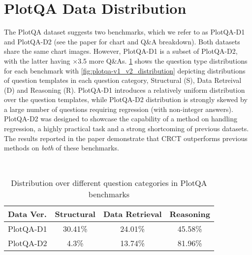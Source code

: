\documentclass[runningheads]{llncs}
\newcommand\our[1][]{CRCT\xspace}
\begin{document}
\section{PlotQA Data Distribution}
The PlotQA dataset suggests two benchmarks, which we refer to as PlotQA-D1 and PlotQA-D2 (see the paper for chart and Q\&A breakdown). Both datasets share the same chart images. However, PlotQA-D1 is a subset of PlotQA-D2, with the latter having $\times$3.5 more Q\&As. \cref{table:plotqa_question_distribution} shows the question type distributions for each benchmark with \cref{fig:plotqa-v1_v2_distribution} depicting distributions of question templates in each question category, Structural (S), Data Retreival (D) and Reasoning (R). PlotQA-D1 introduces a relatively uniform distribution over the question templates, while PlotQA-D2 distribution is strongly skewed by a large number of questions requiring regression (with non-integer answers). PlotQA-D2 was designed to showcase the capability of a method on handling regression, a highly practical task and a strong shortcoming of previous datasets. The results reported in the paper demonstrate that \our outperforms previous methods on \emph{both} of these benchmarks.
\begin{figure*}[ht]
  \centering
  \hfill
   \\
    \caption{PlotQA-D1 and D2 question type distributions. While in Structural questions the distribution is similar, in Data Retrieval and Reasoning questions, PlotQA-D2 is skewed towards few specific templates, which require a regression answer. }
\label{fig:plotqa-v1_v2_distribution}
\end{figure*}




\begin{table}[ht]
\begin{center}
\caption{Distribution over different question categories in PlotQA benchmarks}
\vspace{5mm}
\begin{tabular}{@{}lccc@{}}
\toprule
Data Ver. & \multicolumn{1}{l}{Structural} & \multicolumn{1}{l}{Data Retrieval} & \multicolumn{1}{l}{Reasoning} \\ \midrule
PlotQA-D1 & 30.41\%                        & 24.01\%                            & 45.58\%                       \\
PlotQA-D2 & 4.3\%                          & 13.74\%                            & 81.96\%                       \\ \bottomrule
\end{tabular}
\label{table:plotqa_question_distribution}


\end{center}

\end{table}
\end{document}
